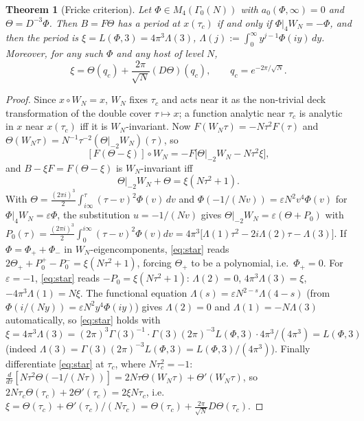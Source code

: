 \documentclass[11pt]{amsart}
\newtheorem{theorem}{Theorem}[section]
\theoremstyle{definition}
\theoremstyle{remark}
\newcommand{\ct}{a_0}\renewcommand{\Re}{\operatorname{Re}}\renewcommand{\Im}{\operatorname{Im}}
\begin{document}
\begin{theorem}[Fricke criterion]\label{thm:fricke}
Let $\Phi\in M_4(\Gamma_0(N))$ with $\ct(\Phi,\infty)=0$ and $\Theta=D^{-3}\Phi$. Then $B=F\Theta$ has a period at $x(\tau_c)$ if and only if $\Phi|_4W_N=-\Phi$, and then the period is $\xi=L(\Phi,3)=4\pi^3\Lambda(3)$, $\Lambda(j):=\int_0^\infty y^{j-1}\Phi(iy)\,dy$. Moreover, for any such $\Phi$ and any host of level $N$,
$$\xi=\Theta(q_c)+\frac{2\pi}{\sqrt N}(D\Theta)(q_c),\qquad q_c=e^{-2\pi/\sqrt N}.$$
\end{theorem}
\begin{proof}
Since $x\circ W_N=x$, $W_N$ fixes $\tau_c$ and acts near it as the non-trivial deck transformation of the double cover $\tau\mapsto x$; a function analytic near $\tau_c$ is analytic in $x$ near $x(\tau_c)$ iff it is $W_N$-invariant. Now $F(W_N\tau)=-N\tau^2F(\tau)$ and $\Theta(W_N\tau)=N^{-1}\tau^{-2}(\Theta|_{-2}W_N)(\tau)$, so
$$[F(\Theta-\xi)]\circ W_N=-F\bigl[\Theta|_{-2}W_N-N\tau^2\xi\bigr],$$
and $B-\xi F=F(\Theta-\xi)$ is $W_N$-invariant iff
\begin{equation}\label{eq:star}
\Theta|_{-2}W_N+\Theta=\xi(N\tau^2+1).
\end{equation}
With $\Theta=\frac{(2\pi i)^3}2\int_{i\infty}^\tau(\tau-v)^2\Phi(v)\,dv$ and $\Phi(-1/(Nv))=\varepsilon N^2v^4\Phi(v)$ for $\Phi|_4W_N=\varepsilon\Phi$, the substitution $u=-1/(Nv)$ gives $\Theta|_{-2}W_N=\varepsilon(\Theta+P_0)$ with $P_0(\tau)=\frac{(2\pi i)^3}2\int_0^{i\infty}(\tau-v)^2\Phi(v)dv=4\pi^3\bigl[\Lambda(1)\tau^2-2i\Lambda(2)\tau-\Lambda(3)\bigr]$. If $\Phi=\Phi_++\Phi_-$ in $W_N$-eigencomponents, \eqref{eq:star} reads $2\Theta_++P_0^+-P_0^-=\xi(N\tau^2+1)$, forcing $\Theta_+$ to be a polynomial, i.e.\ $\Phi_+=0$. For $\varepsilon=-1$, \eqref{eq:star} reads $-P_0=\xi(N\tau^2+1)$: $\Lambda(2)=0$, $4\pi^3\Lambda(3)=\xi$, $-4\pi^3\Lambda(1)=N\xi$. The functional equation $\Lambda(s)=\varepsilon N^{2-s}\Lambda(4-s)$ (from $\Phi(i/(Ny))=\varepsilon N^2y^4\Phi(iy)$) gives $\Lambda(2)=0$ and $\Lambda(1)=-N\Lambda(3)$ automatically, so \eqref{eq:star} holds with $\xi=4\pi^3\Lambda(3)=(2\pi)^3\Gamma(3)^{-1}\cdot\Gamma(3)(2\pi)^{-3}L(\Phi,3)\cdot4\pi^3/(4\pi^3)=L(\Phi,3)$ (indeed $\Lambda(3)=\Gamma(3)(2\pi)^{-3}L(\Phi,3)=L(\Phi,3)/(4\pi^3)$). Finally differentiate \eqref{eq:star} at $\tau_c$, where $N\tau_c^2=-1$: $\frac d{d\tau}[N\tau^2\Theta(-1/(N\tau))]=2N\tau\Theta(W_N\tau)+\Theta'(W_N\tau)$, so $2N\tau_c\Theta(\tau_c)+2\Theta'(\tau_c)=2\xi N\tau_c$, i.e.\ $\xi=\Theta(\tau_c)+\Theta'(\tau_c)/(N\tau_c)=\Theta(\tau_c)+\frac{2\pi}{\sqrt N}D\Theta(\tau_c)$.
\end{proof}
\end{document}
